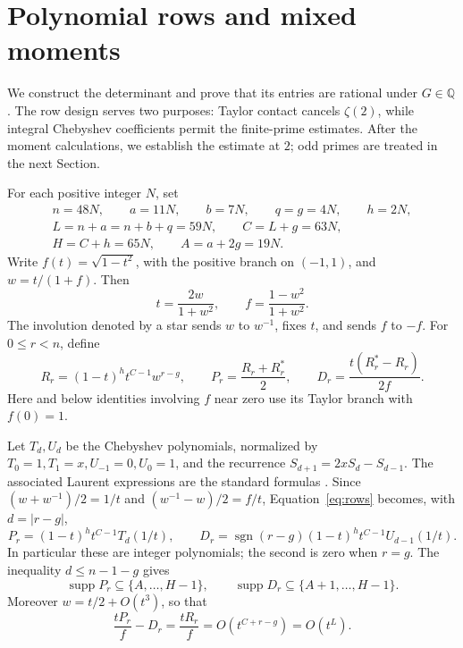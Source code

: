 \section{Polynomial rows and mixed moments}\label{sec:foundations}

We construct the determinant and prove that its entries are rational
under $G\in\mathbb Q$. The row design serves two purposes: Taylor
contact cancels $\zeta(2)$, while integral Chebyshev coefficients permit
the finite-prime estimates. After the moment calculations, we establish
the estimate at $2$; odd primes are treated in the next Section.

For each positive integer $N$, set
\begin{equation}\label{eq:parameters}
\begin{gathered}
n=48N,\qquad a=11N,\qquad b=7N,\qquad q=g=4N,\qquad h=2N,\\
L=n+a=n+b+q=59N,\qquad C=L+g=63N,\\
H=C+h=65N,\qquad A=a+2g=19N.
\end{gathered}
\end{equation}
Write $f(t)=\sqrt{1-t^2}$, with the positive branch on $(-1,1)$,
and $w=t/(1+f)$. Then
\[
t=\frac{2w}{1+w^2},\qquad f=\frac{1-w^2}{1+w^2}.
\]
The involution denoted by a star sends $w$ to $w^{-1}$, fixes $t$,
and sends $f$ to $-f$. For $0\le r<n$, define
\begin{equation}\label{eq:rows}
R_r=(1-t)^h t^{C-1}w^{r-g},\qquad
P_r=\frac{R_r+R_r^*}{2},\qquad
D_r=\frac{t(R_r^*-R_r)}{2f}.
\end{equation}
Here and below identities involving $f$ near zero use its Taylor branch
with $f(0)=1$.

Let $T_d,U_d$ be the Chebyshev polynomials, normalized by
$T_0=1,T_1=x,U_{-1}=0,U_0=1$, and the recurrence
$S_{d+1}=2xS_d-S_{d-1}$. The associated Laurent expressions are the
standard formulas \cite[Equations~(18.5.1)--(18.5.2)]{DLMFChebyshev}.
Since
$(w+w^{-1})/2=1/t$ and $(w^{-1}-w)/2=f/t$, Equation~\eqref{eq:rows}
becomes, with $d=|r-g|$,
\[
P_r=(1-t)^h t^{C-1}T_d(1/t),\qquad
D_r=\operatorname{sgn}(r-g)(1-t)^h t^{C-1}U_{d-1}(1/t).
\]
In particular these are integer polynomials; the second is zero when $r=g$.
The inequality $d\le n-1-g$ gives
\begin{equation}\label{eq:row-support}
\operatorname{supp}P_r\subseteq\{A,\ldots,H-1\},\qquad
\operatorname{supp}D_r\subseteq\{A+1,\ldots,H-1\}.
\end{equation}
Moreover $w=t/2+O(t^3)$, so that
\begin{equation}\label{eq:contact}
\frac{tP_r}{f}-D_r=\frac{tR_r}{f}=O(t^{C+r-g})=O(t^L).
\end{equation}

